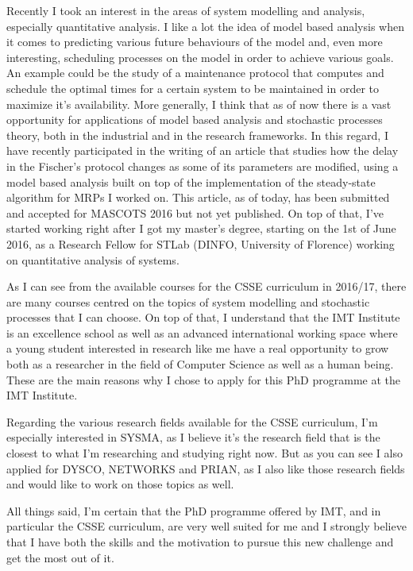 \documentclass{article}
\begin{document}
    Recently I took an interest in the areas of system modelling and analysis, especially quantitative analysis. I like a lot the idea of model based analysis when it comes to predicting various future behaviours of the model and, even more interesting, scheduling processes on the model in order to achieve various goals. An example could be the study of a maintenance protocol that computes and schedule the optimal times for a certain system to be maintained in order to maximize it's availability. More generally, I think that as of now there is a vast opportunity for applications of model based analysis and stochastic processes theory, both in the industrial and in the research frameworks. In this regard, I have recently participated in the writing of an article that studies how the delay in the Fischer's protocol changes as some of its parameters are modified, using a model based analysis built on top of the implementation of the steady-state algorithm for MRPs I worked on. This article, as of today, has been submitted and accepted for MASCOTS 2016 but not yet published. On top of that, I've started working right after I got my master's degree, starting on the 1st of June 2016, as a Research Fellow for STLab (DINFO, University of Florence) working on quantitative analysis of systems. \par \bigskip
    
    As I can see from the available courses for the CSSE curriculum in 2016/17, there are many courses centred on the topics of system modelling and stochastic processes that I can choose. On top of that, I understand that the IMT Institute is an excellence school as well as an advanced international working space where a young student interested in research like me have a real opportunity to grow both as a researcher in the field of Computer Science as well as a human being. These are the main reasons why I chose to apply for this PhD programme at the IMT Institute. \par \bigskip
    
    Regarding the various research fields available for the CSSE curriculum, I'm especially interested in SYSMA, as I believe it's the research field that is the closest to what I'm researching and studying right now. But as you can see I also applied for DYSCO, NETWORKS and PRIAN, as I also like those research fields and would like to work on those topics as well. \par \bigskip
    
    All things said, I'm certain that the PhD programme offered by IMT, and in particular the CSSE curriculum, are very well suited for me and I strongly believe that I have both the skills and the motivation to pursue this new challenge and get the most out of it. \par \bigskip
    
\end{document}
